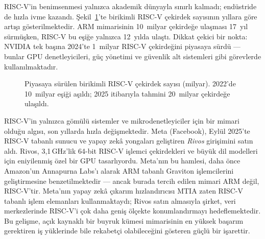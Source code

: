 RISC-V'in benimsenmesi yalnızca akademik dünyayla sınırlı kalmadı; endüstride de hızla ivme kazandı. Şekil~\ref{fig:riscv-buyume}'te birikimli RISC-V çekirdek sayısının yıllara göre artışı gösterilmektedir. ARM mimarisinin 10~milyar çekirdeğe ulaşması 17~yıl sürmüşken, RISC-V bu eşiğe yalnızca 12~yılda ulaştı. Dikkat çekici bir nokta: NVIDIA tek başına 2024'te 1~milyar RISC-V çekirdeğini piyasaya sürdü --- bunlar GPU denetleyicileri, güç yönetimi ve güvenlik alt sistemleri gibi görevlerde kullanılmaktadır.

\begin{figure}[H]
\centering
{}
\caption[RISC-V çekirdek sayısının yıllara göre büyümesi]{Piyasaya sürülen birikimli RISC-V çekirdek sayısı (milyar). 2022'de 10~milyar eşiği aşıldı; 2025 itibarıyla tahmini 20~milyar çekirdeğe ulaşıldı.}
\label{fig:riscv-buyume}
\end{figure}

\begin{bilginot}
RISC-V'in yalnızca gömülü sistemler ve mikrodenetleyiciler için bir mimari olduğu algısı, son yıllarda hızla değişmektedir. Meta (Facebook), Eylül 2025'te RISC-V tabanlı sunucu ve yapay zekâ yongaları geliştiren \emph{Rivos} girişimini satın aldı. Rivos, 3{,}1\,GHz'lik 64-bit RISC-V işlemci çekirdekleri ve büyük dil modelleri için eniyilenmiş özel bir GPU tasarlıyordu. Meta'nın bu hamlesi, daha önce Amazon'un Annapurna Labs'ı alarak ARM tabanlı Graviton işlemcilerini geliştirmesine benzetilmektedir --- ancak burada tercih edilen mimari ARM değil, RISC-V'tir. Meta'nın yapay zekâ çıkarım hızlandırıcısı MTIA zaten RISC-V tabanlı işlem elemanları kullanmaktaydı; Rivos satın almasıyla şirket, veri merkezlerinde RISC-V'i çok daha geniş ölçekte konumlandırmayı hedeflemektedir. Bu gelişme, açık kaynaklı bir buyruk kümesi mimarisinin en yüksek başarım gerektiren iş yüklerinde bile rekabetçi olabileceğini gösteren güçlü bir işarettir.
\end{bilginot}

